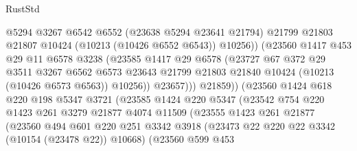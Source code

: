 \begin{lexlean}{RustStd}
\begin{coremodule}
{\begin{coremodule}
{{{{{{{{{{{{{{{{{{{{{{{{{{                              @5294
                              @3267
                              @6542
                              @6552
                              (@23638 @5294 @23641 @21794)
                              @21799
                              @21803
                              @21807
                              @10424
                              (@10213 (@10426 @6552 @6543))
                              @10256))
                          (@23560
                            @1417
                            @453
                            @29
                            @11
                            @6578
                            @3238
                            (@23585
                              @1417
                              @29
                              @6578
                              (@23727
                                @67
                                @372
                                @29
                                @3511
                                @3267
                                @6562
                                @6573
                                @23643
                                @21799
                                @21803
                                @21840
                                @10424
                                (@10213 (@10426 @6573 @6563))
                                @10256))
                            @23657)))
                      @21859))
                  (@23560
                    @1424
                    @618
                    @220
                    @198
                    @5347
                    @3721
                    (@23585
                      @1424
                      @220
                      @5347
                      (@23542
                        @754
                        @220
                        @1423
                        @261
                        @3279
                        @21877
                        @4074
                        @11509
                        (@23555
                          @1423
                          @261
                          @21877
                          (@23560
                            @494
                            @601
                            @220
                            @251
                            @3342
                            @3918
                            (@23473 @22 @220 @22 @3342 (@10154 (@23478 @22)) @10668)
                            (@23560
                              @599
                              @453
}}}}}}}}}}}}}}}}}}}}}}}}}}
\end{coremodule}}
\end{coremodule}
\end{lexlean}
